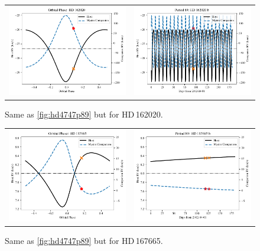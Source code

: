 \begin{figure}
    \centering
    \begin{tabular}{cc}
        \includegraphics[width=0.45\linewidth]{figures/direct-recovery/orbital-plots/HD162020_orbital_phase.pdf} &
        \includegraphics[width=0.45\linewidth]{figures/direct-recovery/orbital-plots/HD162020_p89.pdf}\\
    \end{tabular}
    \caption[]{Same as \cref{fig:hd4747p89} but for {HD\,162020}.}
    \label{fig:hd162020p89}
\end{figure}

\begin{figure}
    \centering
    \begin{tabular}{cc}
        \includegraphics[width=0.45\linewidth]{figures/direct-recovery/orbital-plots/HD167665_orbital_phase.pdf} &
        \includegraphics[width=0.45\linewidth]{figures/direct-recovery/orbital-plots/HD167665_p89.pdf}\\
    \end{tabular}
    \caption[]{Same as \cref{fig:hd4747p89} but for {HD\,167665}.}
    \label{fig:hd167665p89}
\end{figure}

